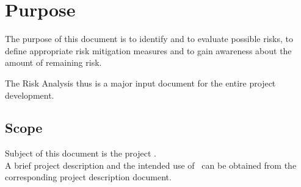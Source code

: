 \section{Purpose}
The purpose of this document is to identify and to evaluate possible risks, to define appropriate risk mitigation measures and to gain awareness about the amount of remaining risk.

The Risk Analysis thus is a major input document for the entire project development.

\subsection{Scope}
Subject of this document is the project \textit{\ThisProjectName}. \\
A brief project description and the intended use of \ThisProjectName~can be obtained from the corresponding project description document.